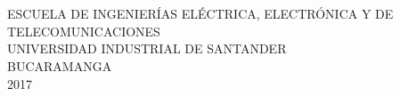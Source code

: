 \noindent \begin{center}
\textbf{\large ~}
\par\end{center}{\large \par}

\noindent \begin{center}
\textbf{\large ~}
\par\end{center}{\large \par}


\noindent \begin{center}%
{\large ESCUELA DE INGENIERÍAS ELÉCTRICA, ELECTRÓNICA Y DE TELECOMUNICACIONES
}\\
{\large UNIVERSIDAD INDUSTRIAL DE SANTANDER}\\ %
{\large BUCARAMANGA}\\%
{\large 2017}%
\par\end{center}{\large \par}

\thispagestyle{empty} %
